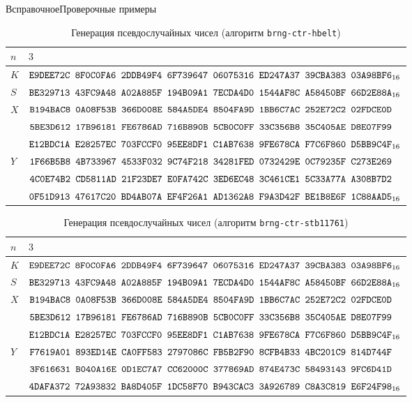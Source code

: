 \begin{appendix}{В}{справочное}{Проверочные примеры}
\begin{table}[H]
\caption{Генерация псевдослучайных чисел (алгоритм \texttt{brng-ctr-hbelt})}
\label{Table.PRNG-CTR1}
\begin{tabular}{|l|l|}
%
\hline
$n$ & 
$3$\\
%
\hline
$K$ & 
$\texttt{E9DEE72C~8F0C0FA6~2DDB49F4~6F739647~06075316~ED247A37~39CBA383~03A98BF6}_{16}$\\
%
\hline
$S$ & 
$\texttt{BE329713~43FC9A48~A02A885F~194B09A1~7ECDA4D0~1544AF8C~A58450BF~66D2E88A}_{16}$\\
%
\hline
$X$ & 
$\texttt{B194BAC8~0A08F53B~366D008E~584A5DE4~8504FA9D~1BB6C7AC~252E72C2~02FDCE0D}$\\
&
$\texttt{5BE3D612~17B96181~FE6786AD~716B890B~5CB0C0FF~33C356B8~35C405AE~D8E07F99}$\\
&
$\texttt{E12BDC1A~E28257EC~703FCCF0~95EE8DF1~C1AB7638~9FE678CA~F7C6F860~D5BB9C4F}_{16}$\\
%
\hline
\hline
$Y$ & 
$\texttt{1F66B5B8~4B733967~4533F032~9C74F218~34281FED~0732429E~0C79235F~C273E269}$\\
&
$\texttt{4C0E74B2~CD5811AD~21F23DE7~E0FA742C~3ED6EC48~3C461CE1~5C33A77A~A308B7D2}$\\
&
$\texttt{0F51D913~47617C20~BD4AB07A~EF4F26A1~AD1362A8~F9A3D42F~BE1B8E6F~1C88AAD5}_{16}$\\
\hline
\end{tabular}
\end{table}

\clearpage

\begin{table}[H]
\caption{Генерация псевдослучайных чисел (алгоритм \texttt{brng-ctr-stb11761})}
\label{Table.PRNG-CTR2}
\begin{tabular}{|l|l|}
%
\hline
$n$ & 
$3$\\
%
\hline
$K$ & 
$\texttt{E9DEE72C~8F0C0FA6~2DDB49F4~6F739647~06075316~ED247A37~39CBA383~03A98BF6}_{16}$\\
%
\hline
$S$ & 
$\texttt{BE329713~43FC9A48~A02A885F~194B09A1~7ECDA4D0~1544AF8C~A58450BF~66D2E88A}_{16}$\\
%
\hline
$X$ & 
$\texttt{B194BAC8~0A08F53B~366D008E~584A5DE4~8504FA9D~1BB6C7AC~252E72C2~02FDCE0D}$\\
&
$\texttt{5BE3D612~17B96181~FE6786AD~716B890B~5CB0C0FF~33C356B8~35C405AE~D8E07F99}$\\
&
$\texttt{E12BDC1A~E28257EC~703FCCF0~95EE8DF1~C1AB7638~9FE678CA~F7C6F860~D5BB9C4F}_{16}$\\
%
\hline
\hline
$Y$ & 
$\texttt{F7619A01~893ED14E~CA0FF583~2797086C~FB5B2F90~8CFB4B33~4BC201C9~814D744F}$\\
&
$\texttt{3F616631~B040A16E~0D1EC7A7~CC62000C~377869AD~874E473C~58493143~9FC6D41D}$\\
&
$\texttt{4DAFA372~72A93832~BA8D405F~1DC58F70~B943CAC3~3A926789~C8A3C819~E6F24F98}_{16}$\\
\hline
\end{tabular}
\end{table}


\end{appendix}
